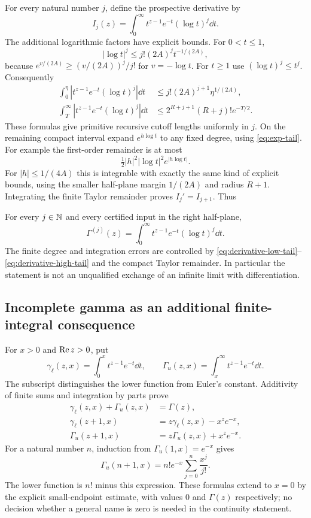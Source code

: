 For every natural number $j$, define the prospective derivative by
\[
 I_j(z)=\int_0^\infty
         t^{z-1}e^{-t}(\log t)^j\dd t.
\]
The additional logarithmic factors have explicit bounds. For
$0<t\le1$,
\[
 |\log t|^j\le j!(2A)^j t^{-1/(2A)},
\]
because $e^{v/(2A)}\ge(v/(2A))^j/j!$ for $v=-\log t$.
For $t\ge1$ use $(\log t)^j\le t^j$. Consequently
\begin{align}
 \int_0^\eta|t^{z-1}e^{-t}(\log t)^j|\dd t
 &\le j!(2A)^{j+1}\eta^{1/(2A)},\label{eq:derivative-low-tail}\\
 \int_T^\infty|t^{z-1}e^{-t}(\log t)^j|\dd t
 &\le2^{R+j+1}(R+j)!e^{-T/2}.\label{eq:derivative-high-tail}
\end{align}
These formulas give primitive recursive cutoff lengths uniformly in $j$.
On the remaining compact interval expand $e^{h\log t}$ to any fixed
degree, using \eqref{eq:exp-tail}. For example the first-order
remainder is at most
\[
 \tfrac12 |h|^2|\log t|^2e^{|h\log t|}.
\]
For $|h|\le1/(4A)$ this is integrable with exactly the same kind of
explicit bounds, using the smaller half-plane margin $1/(2A)$ and
radius $R+1$. Integrating the finite Taylor remainder proves
$I_j'=I_{j+1}$. Thus
\begin{theorem}
For every $j\in\mathbb N$ and every certified input in the right half-plane,
\[
 \Gamma^{(j)}(z)
   =\int_0^\infty t^{z-1}e^{-t}(\log t)^j\dd t.
\]
The finite degree and integration errors are controlled by
\eqref{eq:derivative-low-tail}--\eqref{eq:derivative-high-tail} and
the compact Taylor remainder. In particular the statement is not an
unqualified exchange of an infinite limit with differentiation.
\end{theorem}

\subsection{Incomplete gamma as an additional finite-integral consequence}

For $x>0$ and $\operatorname{Re} z>0$, put
\[
 \gamma_{\ell}(z,x)=\int_0^x t^{z-1}e^{-t}\dd t,
 \qquad \Gamma_u(z,x)=\int_x^\infty t^{z-1}e^{-t}\dd t.
\]
The subscript distinguishes the lower function from Euler's constant.
Additivity of finite sums and integration by parts prove
\begin{align*}
 \gamma_{\ell}(z,x)+\Gamma_u(z,x)&=\Gamma(z),\\
 \gamma_{\ell}(z+1,x)&=z\gamma_{\ell}(z,x)-x^ze^{-x},\\
 \Gamma_u(z+1,x)&=z\Gamma_u(z,x)+x^ze^{-x}.
\end{align*}
For a natural number $n$, induction from $\Gamma_u(1,x)=e^{-x}$ gives
\[
 \boxed{\displaystyle
 \Gamma_u(n+1,x)=n!e^{-x}\sum_{j=0}^n\frac{x^j}{j!}.}
\]
The lower function is $n!$ minus this expression. These formulas extend
to $x=0$ by the explicit small-endpoint estimate, with values $0$ and
$\Gamma(z)$ respectively; no decision whether a general name is zero
is needed in the continuity statement.
